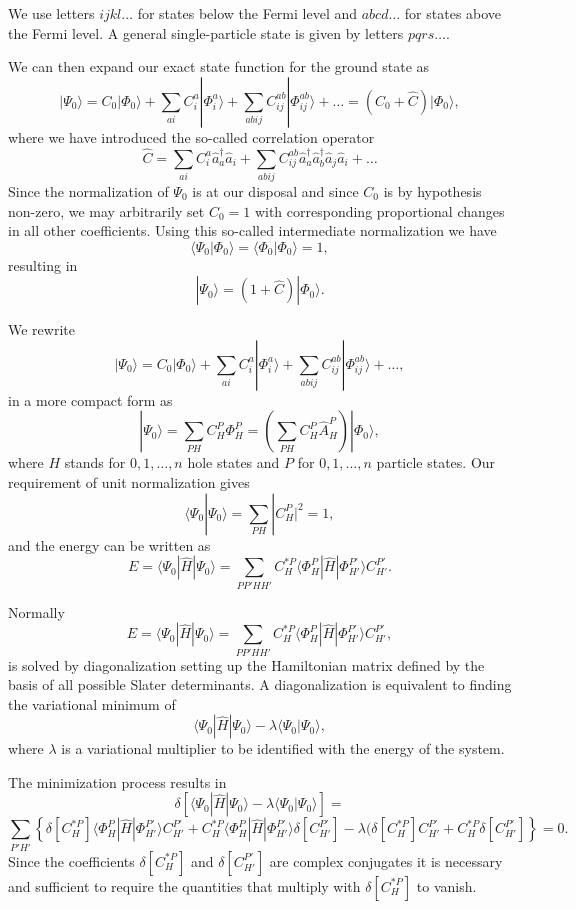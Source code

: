 \documentclass[%
twoside,                 %
final,                   %
10pt]{article}
\begin{document}
We use letters $ijkl\dots$ for states below the Fermi level and $abcd\dots$ for states above the Fermi level. A general single-particle state is given by letters $pqrs\dots$.

We can then expand our exact state function for the ground state 
as
\[
|\Psi_0\rangle=C_0|\Phi_0\rangle+\sum_{ai}C_i^a|\Phi_i^a\rangle+\sum_{abij}C_{ij}^{ab}|\Phi_{ij}^{ab}\rangle+\dots
=(C_0+\hat{C})|\Phi_0\rangle,
\]
where we have introduced the so-called correlation operator 
\[
\hat{C}=\sum_{ai}C_i^a\hat{a}_{a}^{\dagger}\hat{a}_i  +\sum_{abij}C_{ij}^{ab}\hat{a}_{a}^{\dagger}\hat{a}_{b}^{\dagger}\hat{a}_j\hat{a}_i+\dots
\]
Since the normalization of $\Psi_0$ is at our disposal and since $C_0$ is by hypothesis non-zero, we may arbitrarily set $C_0=1$ with 
corresponding proportional changes in all other coefficients. Using this so-called intermediate normalization we have
\[
\langle \Psi_0 | \Phi_0 \rangle = \langle \Phi_0 | \Phi_0 \rangle = 1, 
\]
resulting in 
\[
|\Psi_0\rangle=(1+\hat{C})|\Phi_0\rangle.
\]


We rewrite 
\[
|\Psi_0\rangle=C_0|\Phi_0\rangle+\sum_{ai}C_i^a|\Phi_i^a\rangle+\sum_{abij}C_{ij}^{ab}|\Phi_{ij}^{ab}\rangle+\dots,
\]
in a more compact form as 
\[
|\Psi_0\rangle=\sum_{PH}C_H^P\Phi_H^P=\left(\sum_{PH}C_H^P\hat{A}_H^P\right)|\Phi_0\rangle,
\]
where $H$ stands for $0,1,\dots,n$ hole states and $P$ for $0,1,\dots,n$ particle states. 
Our requirement of unit normalization gives
\[
\langle \Psi_0 | \Psi_0 \rangle = \sum_{PH}|C_H^P|^2= 1,
\]
and the energy can be written as 
\[
E= \langle \Psi_0 | \hat{H} |\Psi_0 \rangle= \sum_{PP'HH'}C_H^{*P}\langle \Phi_H^P | \hat{H} |\Phi_{H'}^{P'} \rangle C_{H'}^{P'}.
\]


Normally 
\[
E= \langle \Psi_0 | \hat{H} |\Psi_0 \rangle= \sum_{PP'HH'}C_H^{*P}\langle \Phi_H^P | \hat{H} |\Phi_{H'}^{P'} \rangle C_{H'}^{P'},
\]
is solved by diagonalization setting up the Hamiltonian matrix defined by the basis of all possible Slater determinants. A diagonalization
is equivalent to finding the variational minimum   of 
\[
 \langle \Psi_0 | \hat{H} |\Psi_0 \rangle-\lambda \langle \Psi_0 |\Psi_0 \rangle,
\]
where $\lambda$ is a variational multiplier to be identified with the energy of the system.

The minimization process results in 
\[
\delta\left[ \langle \Psi_0 | \hat{H} |\Psi_0 \rangle-\lambda \langle \Psi_0 |\Psi_0 \rangle\right]=
\]
\[
\sum_{P'H'}\left\{\delta[C_H^{*P}]\langle \Phi_H^P | \hat{H} |\Phi_{H'}^{P'} \rangle C_{H'}^{P'}+
C_H^{*P}\langle \Phi_H^P | \hat{H} |\Phi_{H'}^{P'} \rangle \delta[C_{H'}^{P'}]-
\lambda( \delta[C_H^{*P}]C_{H'}^{P'}+C_H^{*P}\delta[C_{H'}^{P'}]\right\} = 0.
\]
Since the coefficients $\delta[C_H^{*P}]$ and $\delta[C_{H'}^{P'}]$ are complex conjugates it is necessary and sufficient to require the quantities that multiply with $\delta[C_H^{*P}]$ to vanish.  
\end{document}
